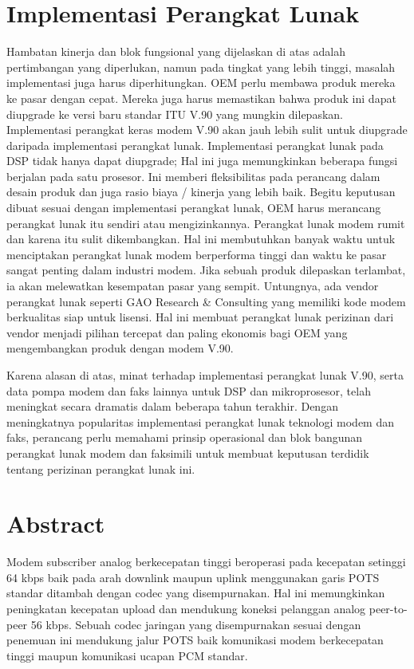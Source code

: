 
\section{Implementasi Perangkat Lunak}
Hambatan kinerja dan blok fungsional yang dijelaskan di atas adalah pertimbangan yang diperlukan, namun pada tingkat yang lebih tinggi, masalah implementasi juga harus diperhitungkan. OEM perlu membawa produk mereka ke pasar dengan cepat. Mereka juga harus memastikan bahwa produk ini dapat diupgrade ke versi baru standar ITU V.90 yang mungkin dilepaskan. Implementasi perangkat keras modem V.90 akan jauh lebih sulit untuk diupgrade daripada implementasi perangkat lunak. Implementasi perangkat lunak pada DSP tidak hanya dapat diupgrade; Hal ini juga memungkinkan beberapa fungsi berjalan pada satu prosesor. Ini memberi fleksibilitas pada perancang dalam desain produk dan juga rasio biaya / kinerja yang lebih baik. Begitu keputusan dibuat sesuai dengan implementasi perangkat lunak, OEM harus merancang perangkat lunak itu sendiri atau mengizinkannya. Perangkat lunak modem rumit dan karena itu sulit dikembangkan. Hal ini membutuhkan banyak waktu untuk menciptakan perangkat lunak modem berperforma tinggi dan waktu ke pasar sangat penting dalam industri modem. Jika sebuah produk dilepaskan terlambat, ia akan melewatkan kesempatan pasar yang sempit. Untungnya, ada vendor perangkat lunak seperti GAO Research \& Consulting yang memiliki kode modem berkualitas siap untuk lisensi. Hal ini membuat perangkat lunak perizinan dari vendor menjadi pilihan tercepat dan paling ekonomis bagi OEM yang mengembangkan produk dengan modem V.90.

Karena alasan di atas, minat terhadap implementasi perangkat lunak V.90, serta data pompa modem dan faks lainnya untuk DSP dan mikroprosesor, telah meningkat secara dramatis dalam beberapa tahun terakhir. Dengan meningkatnya popularitas implementasi perangkat lunak teknologi modem dan faks, perancang perlu memahami prinsip operasional dan blok bangunan perangkat lunak modem dan faksimili untuk membuat keputusan terdidik tentang perizinan perangkat lunak ini.

\section{Abstract}
Modem subscriber analog berkecepatan tinggi beroperasi pada kecepatan setinggi 64 kbps baik pada arah downlink maupun uplink menggunakan garis POTS standar ditambah dengan codec yang disempurnakan. Hal ini memungkinkan peningkatan kecepatan upload dan mendukung koneksi pelanggan analog peer-to-peer 56 kbps. Sebuah codec jaringan yang disempurnakan sesuai dengan penemuan ini mendukung jalur POTS baik komunikasi modem berkecepatan tinggi maupun komunikasi ucapan PCM standar.

